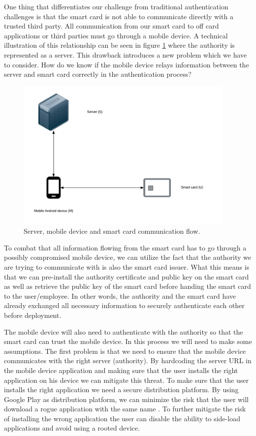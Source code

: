 One thing that differentiates our challenge from traditional authentication challenges is that the smart card is not able to communicate directly with a trusted third party. All communication from our smart card to off card applications or third parties must go through a mobile device. A technical illustration of this relationship can be seen in figure \ref{fig:smu} where the authority is represented as a server. This drawback introduces a new problem which we have to consider. How do we know if the mobile device relays information between the server and smart card correctly in the authentication process?

\begin{figure}[h!]
  \captionsetup{justification=centering,margin=1.5cm}
  \caption{Server, mobile device and smart card communication flow.}
  \label{fig:smu}
  \centering
    \includegraphics[width=0.95\textwidth]{images/SMU.png}
\end{figure}

To combat that all information flowing from the smart card has to go through a possibly compromised mobile device, we can utilize the fact that the authority we are trying to communicate with is also the smart card issuer. What this means is that we can pre-install the authority certificate and public key on the smart card as well as retrieve the public key of the smart card before handing the smart card to the user/employee. In other words, the authority and the smart card have already exchanged all necessary information to securely authenticate each other before deployment.

The mobile device will also need to authenticate with the authority so that the smart card can trust the mobile device. In this process we will need to make some assumptions. The first problem is that we need to  ensure that the mobile device communicates with the right server (authority). By hardcoding the server URL in the mobile device application and making sure that the user installs the right application on his device we can mitigate this threat. To make sure that the user installs the right application we need a secure distribution platform. By using Google Play as distribution platform, we can minimize the risk that the user will download a rogue application with the same name \cite{googlePlaySecureDist}. To further mitigate the risk of installing the wrong application the user can disable the ability to side-load applications and avoid using a rooted device.

